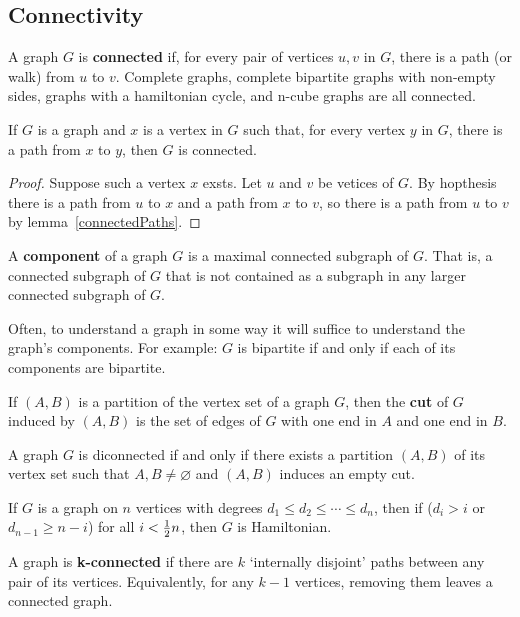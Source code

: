 \documentclass[12pt]{article}
\begin{document}
\subsection{Connectivity}
A graph $G$ is {\bf connected} if, for every pair of vertices $u,v$ in $G$, there is a path (or walk) from $u$ to $v$. Complete graphs, complete bipartite graphs with non-empty sides, graphs with a hamiltonian cycle, and n-cube graphs are all connected.

\begin{lemma}
If $G$ is a graph and $x$ is a vertex in $G$ such that, for every vertex $y$ in $G$, there is a path from $x$ to $y$, then $G$ is connected.
\end{lemma}

\begin{proof}
Suppose such a vertex $x$ exsts. Let $u$ and $v$ be vetices of $G$. By hopthesis there is a path from $u$ to $x$ and a path from $x$ to $v$, so there is a path from $u$ to $v$ by lemma~\ref{connectedPaths}.
\end{proof}

A {\bf component} of a graph $G$ is a maximal connected subgraph of $G$. That is, a connected subgraph of $G$ that is not contained as a subgraph in any larger connected subgraph of $G$.

Often, to understand a graph in some way it will suffice to understand the graph's components. For example: $G$ is bipartite if and only if each of its components are bipartite.

If $(A,B)$ is a partition of the vertex set of a graph $G$, then the {\bf cut} of $G$ induced by $(A,B)$ is the set of edges of $G$ with one end in $A$ and one end in $B$.

\begin{lemma}
A graph $G$ is diconnected if and only if there exists a partition $(A,B)$ of its vertex set such that $A,B \neq \varnothing$ and $(A,B)$ induces an empty cut.
\end{lemma}

\begin{theorem}[Chuatal '72]
If $G$ is a graph on $n$ vertices with degrees $d_1 \leq d_2 \leq \cdots \leq d_n$, then if ($d_i > i$ or $d_{n-1} \geq n-i$) for all $i < \frac{1}{2} n$, then $G$ is Hamiltonian.
\end{theorem}

A graph is {\bf k-connected} if there are $k$ `internally disjoint' paths between any pair of its vertices. Equivalently, for any $k-1$ vertices, removing them leaves a connected graph.
\end{document}
